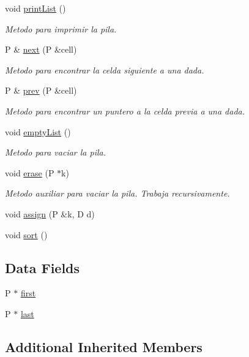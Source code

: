 \begin{DoxyCompactItemize}
void \hyperlink{classQueue_aa461f8fb363f960a6e0eb34b18503eaa}{print\+List} ()
\begin{DoxyCompactList}\small\item\em Metodo para imprimir la pila. \end{DoxyCompactList}\item 
P \& \hyperlink{classQueue_a989738789320704ae2d597e73919aefa}{next} (P \&cell)
\begin{DoxyCompactList}\small\item\em Metodo para encontrar la celda siguiente a una dada. \end{DoxyCompactList}\item 
P \& \hyperlink{classQueue_a238a908300566b4f9bb379216c7527c6}{prev} (P \&cell)
\begin{DoxyCompactList}\small\item\em Metodo para encontrar un puntero a la celda previa a una dada. \end{DoxyCompactList}\item 
void \hyperlink{classQueue_a37e23ca9e4ac29be510833bf6b7f6638}{empty\+List} ()
\begin{DoxyCompactList}\small\item\em Metodo para vaciar la pila. \end{DoxyCompactList}\item 
void \hyperlink{classQueue_aecdcae5571a7f0aebdf1c98f9ec382fa}{erase} (P $\ast$k)
\begin{DoxyCompactList}\small\item\em Metodo auxiliar para vaciar la pila. Trabaja recursivamente. \end{DoxyCompactList}\item 
void \hyperlink{classQueue_af8e5f753e54a7eb2a770c1bbf0c1d8fe}{assign} (P \&k, D d)
\item 
void \hyperlink{classQueue_a896b0e1bcac0d660079eb838c1823446}{sort} ()
\end{DoxyCompactItemize}
\subsection*{Data Fields}
\begin{DoxyCompactItemize}
\item 
P $\ast$ \hyperlink{classQueue_a1d8e79c486d52a6e8b329bf0f337fe06}{first}
\item 
P $\ast$ \hyperlink{classQueue_a466d5b8f1ec5d70fde748ac1b5c989c2}{last}
\end{DoxyCompactItemize}
\subsection*{Additional Inherited Members}


